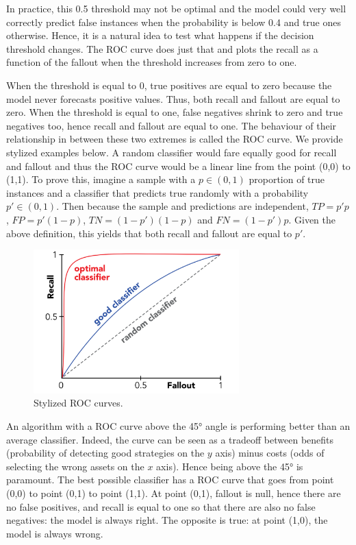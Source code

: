 \documentclass[]{krantz}
\theoremstyle{definition}
\theoremstyle{definition}
\theoremstyle{definition}
\theoremstyle{remark}
\begin{document}
In practice, this 0.5 threshold may not be optimal and the model could
very well correctly predict false instances when the probability is
below 0.4 and true ones otherwise. Hence, it is a natural idea to test
what happens if the decision threshold changes. The ROC curve does just
that and plots the recall as a function of the fallout when the
threshold increases from zero to one.

When the threshold is equal to 0, true positives are equal to zero
because the model never forecasts positive values. Thus, both recall and
fallout are equal to zero. When the threshold is equal to one, false
negatives shrink to zero and true negatives too, hence recall and
fallout are equal to one. The behaviour of their relationship in between
these two extremes is called the ROC curve. We provide stylized examples
below. A random classifier would fare equally good for recall and
fallout and thus the ROC curve would be a linear line from the point
(0,0) to (1,1). To prove this, imagine a sample with a \(p\in (0,1)\)
proportion of true instances and a classifier that predicts true
randomly with a probability \(p'\in (0,1)\). Then because the sample and
predictions are independent, \(TP=p'p\), \(FP = p'(1-p)\),
\(TN=(1-p')(1-p)\) and \(FN=(1-p')p\). Given the above definition, this
yields that both recall and fallout are equal to \(p'\).

\begin{figure}[H]

{\centering \includegraphics[width=300px]{images/ROCcurve} 

}

\caption{Stylized ROC curves.}\label{fig:ROCcurve}
\end{figure}

An algorithm with a ROC curve above the 45° angle is performing better
than an average classifier. Indeed, the curve can be seen as a tradeoff
between benefits (probability of detecting good strategies on the \(y\)
axis) minus costs (odds of selecting the wrong assets on the \(x\)
axis). Hence being above the 45° is paramount. The best possible
classifier has a ROC curve that goes from point (0,0) to point (0,1) to
point (1,1). At point (0,1), fallout is null, hence there are no false
positives, and recall is equal to one so that there are also no false
negatives: the model is always right. The opposite is true: at point
(1,0), the model is always wrong.
\end{document}
